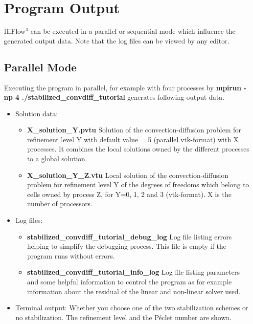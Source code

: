 \documentclass[a4paper, 11pt, twoside]{article}
\begin{document}
\section{Program Output}
HiFlow$^3$ can be executed in a parallel or sequential mode which influence the generated output data. Note that the log files can be viewed by any editor.
\subsection{Parallel Mode} 
Executing the program in parallel, for example with four processes by \textbf{mpirun -np 4 ./stabilized\_convdiff\_tutorial}   
generates following output data. 
\begin{itemize}
\item Solution data:
\begin{itemize}
\item \textbf{X\_solution\_Y.pvtu} Solution of the convection-diffusion problem for refinement level Y with default value = 5 (parallel vtk-format) with X processes. It combines the local solutions owned by the different processes to a global solution.
\item \textbf{X\_solution\_Y\_Z.vtu} Local solution of the convection-diffusion problem for refinement level Y of the degrees of freedoms which belong to cells owned by process Z, for Y=0, 1, 2 and 3 (vtk-format). X is the number of processors.
\end{itemize}
\item Log files:
\begin{itemize}
\item \textbf{stabilized\_convdiff\_tutorial\_debug\_log} Log file listing errors helping to simplify the debugging process. This file is empty if the program runs without errors.
\item \textbf{stabilized\_convdiff\_tutorial\_info\_log} Log file listing parameters and some helpful information to control 
      the program as for example information about the residual of the linear and non-linear solver used.
\end{itemize}
\item Terminal output: Whether you choose one of the two stabilization schemes or no stabilization. The refinement level and the P\'{e}clet number are shown.
\end{itemize}
\end{document}
